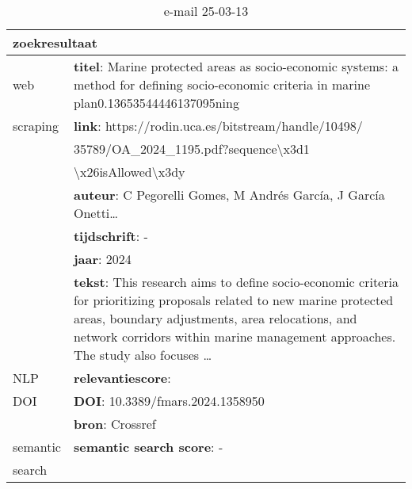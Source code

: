 \begin{table}[h!]
    \caption{e-mail 25-03-13}
    \centering
    \begin{tabularx}{\textwidth}{|p{4cm}|X|} 
        \hline
        \multicolumn{2}{|X|}{\textbf{zoekresultaat}} \\
        \hline
        web &\textbf{titel}: Marine protected areas as socio-economic systems: a method for defining socio-economic criteria in marine plan0.13653544446137095ning\\
        scraping&\textbf{link}: https://rodin.uca.es/bitstream/handle/10498/\\&35789/OA_2024_1195.pdf?sequence\textbackslash x3d1\\&\textbackslash x26isAllowed\textbackslash x3dy\\
        &\textbf{auteur}: C Pegorelli Gomes, M Andrés García, J García Onetti…\\
        &\textbf{tijdschrift}: -\\
        &\textbf{jaar}: 2024\\
        &\textbf{tekst}: This research aims to define socio-economic criteria for prioritizing proposals related to new marine protected areas, boundary adjustments, area relocations, and network corridors within marine management approaches. The study also focuses …\\
        \hline
        NLP&\textbf{relevantiescore}: \\
        \hline
        DOI&\textbf{DOI}: 10.3389/fmars.2024.1358950\\
        &\textbf{bron}: Crossref\\
        \hline
        semantic&\textbf{semantic search score}: -\\
        search&\\
        \hline
    \end{tabularx}
    \label{table:email20250313}
\end{table}
